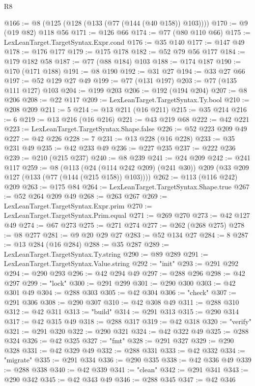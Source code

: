 \begin{lexlean}{R8}
\begin{coremodule}
@166 := @8 (@125 (@128 (@133 (@77 (@144 (@40 @158)) @103))))
@170 := @9 (@19 @82) @118 @56
@171 := @126 @66
@174 := @77 (@80 @110 @66)
@175 := LexLeanTarget.TargetSyntax.Expr.cond
@176 := @35 @140
@177 := @147 @49
@178 := @176 @177
@179 := @175 @178
@182 := @52 @79 @56 @177
@184 := @179 @182 @58
@187 := @77 (@88 @184) @103
@188 := @174 @187
@190 := @170 (@171 @188)
@191 := @8 @190
@192 := @31 @27
@194 := @33 @27 @66
@197 := @52 @129 @27 @49
@199 := @77 (@131 @197)
@203 := @77 (@135 @111 @127) @103
@204 := @199 @203
@206 := @192 (@194 @204)
@207 := @8 @206
@208 := @22 @117
@209 := LexLeanTarget.TargetSyntax.Ty.bool
@210 := @208 @209
@211 := 5
@214 := @13 @211 (@16 @211)
@215 := @35 @214
@216 := 6
@219 := @13 @216 (@16 @216)
@221 := @43 @219 @68
@222 := @42 @221
@223 := LexLeanTarget.TargetSyntax.Shape.false
@226 := @52 @223 @209 @49
@227 := @42 @226
@228 := 7
@231 := @13 @228 (@16 @228)
@233 := @35 @231 @49
@235 := @42 @233 @49
@236 := @227 @235
@237 := @222 @236
@239 := @210 (@215 @237)
@240 := @8 @239
@241 := @24 @209
@242 := @241 @117
@259 := @8
    (@113
      (@24 (@114 @242 @209) (@241 @30))
      @209
      (@33 @209 @127 (@133 (@77 (@144 (@215 @158)) @103))))
@262 := @113 (@116 @242) @209
@263 := @175 @84
@264 := LexLeanTarget.TargetSyntax.Shape.true
@267 := @52 @264 @209 @49
@268 := @263 @267
@269 := LexLeanTarget.TargetSyntax.Expr.prim
@270 := LexLeanTarget.TargetSyntax.Prim.equal
@271 := @269 @270
@273 := @42 @127 @49
@274 := @67 @273
@275 := @271 @274
@277 := @262 (@268 @275)
@278 := @8 @277
@281 := @9 @20 @29 @27
@283 := @52 @134 @27
@284 := 8
@287 := @13 @284 (@16 @284)
@288 := @35 @287
@289 := LexLeanTarget.TargetSyntax.Ty.string
@290 := @89 @289
@291 := LexLeanTarget.TargetSyntax.Value.string
@292 := "init"
@293 := @291 @292
@294 := @290 @293
@296 := @42 @294 @49
@297 := @288 @296
@298 := @42 @297
@299 := "lock"
@300 := @291 @299
@301 := @290 @300
@303 := @42 @301 @49
@304 := @288 @303
@305 := @42 @304
@306 := "check"
@307 := @291 @306
@308 := @290 @307
@310 := @42 @308 @49
@311 := @288 @310
@312 := @42 @311
@313 := "build"
@314 := @291 @313
@315 := @290 @314
@317 := @42 @315 @49
@318 := @288 @317
@319 := @42 @318
@320 := "verify"
@321 := @291 @320
@322 := @290 @321
@324 := @42 @322 @49
@325 := @288 @324
@326 := @42 @325
@327 := "fmt"
@328 := @291 @327
@329 := @290 @328
@331 := @42 @329 @49
@332 := @288 @331
@333 := @42 @332
@334 := "migrate"
@335 := @291 @334
@336 := @290 @335
@338 := @42 @336 @49
@339 := @288 @338
@340 := @42 @339
@341 := "clean"
@342 := @291 @341
@343 := @290 @342
@345 := @42 @343 @49
@346 := @288 @345
@347 := @42 @346

\end{coremodule}
\end{lexlean}
